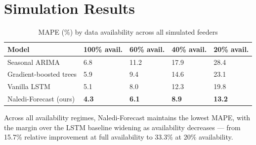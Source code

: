 \section{Simulation Results}
\begin{table}[htbp]
\centering
\caption{MAPE (\%) by data availability across all simulated feeders}
\label{tab:mape-results}
\begin{tabularx}{\linewidth}{@{}lXXXX@{}}
\toprule
\textbf{Model} & \textbf{100\% avail.} & \textbf{60\% avail.} & \textbf{40\% avail.} & \textbf{20\% avail.} \\
\midrule
Seasonal ARIMA & 6.8 & 11.2 & 17.9 & 28.4 \\
Gradient-boosted trees & 5.9 & 9.4 & 14.6 & 23.1 \\
Vanilla LSTM & 5.1 & 8.0 & 12.3 & 19.8 \\
\rowcolor{witssand} Naledi-Forecast (ours) & \textbf{4.3} & \textbf{6.1} & \textbf{8.9} & \textbf{13.2} \\
\bottomrule
\end{tabularx}
\end{table}

Across all availability regimes, Naledi-Forecast maintains the lowest MAPE, with the margin
over the LSTM baseline widening as availability decreases --- from 15.7\% relative
improvement at full availability to 33.3\% at 20\% availability.
